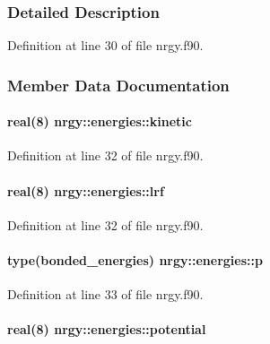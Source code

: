 \subsubsection{Detailed Description}


Definition at line 30 of file nrgy.\-f90.



\subsubsection{Member Data Documentation}
\hypertarget{structnrgy_1_1energies_abc42dff4be0871a59aa72f2e75e0d0e0}{
\paragraph[{kinetic}]{\setlength{\rightskip}{0pt plus 5cm}real(8) nrgy\-::energies\-::kinetic}}\label{structnrgy_1_1energies_abc42dff4be0871a59aa72f2e75e0d0e0}


Definition at line 32 of file nrgy.\-f90.

\hypertarget{structnrgy_1_1energies_aa6aa6c3cc11f7938a3b912fd2a14ec42}{
\paragraph[{lrf}]{\setlength{\rightskip}{0pt plus 5cm}real(8) nrgy\-::energies\-::lrf}}\label{structnrgy_1_1energies_aa6aa6c3cc11f7938a3b912fd2a14ec42}


Definition at line 32 of file nrgy.\-f90.

\hypertarget{structnrgy_1_1energies_ac8a23f682719e0af711eea372cceb264}{
\paragraph[{p}]{\setlength{\rightskip}{0pt plus 5cm}type({\bf bonded\-\_\-energies}) nrgy\-::energies\-::p}}\label{structnrgy_1_1energies_ac8a23f682719e0af711eea372cceb264}


Definition at line 33 of file nrgy.\-f90.

\hypertarget{structnrgy_1_1energies_a6a5ddf1b45a4c196cbeab13812f80e52}{
\paragraph[{potential}]{\setlength{\rightskip}{0pt plus 5cm}real(8) nrgy\-::energies\-::potential}}\label{structnrgy_1_1energies_a6a5ddf1b45a4c196cbeab13812f80e52}


